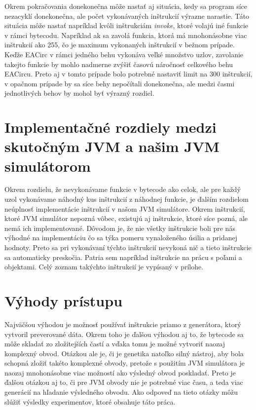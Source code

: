 Okrem pokračovania donekonečna môže nastať aj situácia, kedy sa program síce nezacyklí donekonečna, ale počet vykonávaných inštrukcií výrazne narastie. Táto situácia môže nastať napríklad kvôli inštrukciám \textit{invoke}, ktoré volajú iné funkcie v rámci bytecodu. Napríklad ak sa zavolá funkcia, ktorá má mnohonásobne viac inštrukcií ako 255, čo je maximum vykonaných inštrukcií v bežnom prípade. Keďže EACirc v rámci jedného behu vykonáva veľké množstvo uzlov, zavolanie takejto funkcie by mohlo nadmerne zvýšiť časovú náročnosť celkového behu EACircu. Preto aj v tomto prípade bolo potrebné nastaviť limit na 300 inštrukcií, v opačnom prípade by sa síce behy nepočítali donekonečna, ale medzi časmi jednotlivých behov by mohol byť výrazný rozdiel.

\section{Implementačné rozdiely medzi skutočným JVM a našim JVM simulátorom}
\label{sec:impl-diff}

Okrem rozdielu, že nevykonávame funkcie v bytecode ako celok, ale pre každý uzol vykonávame náhodný kus inštrukcií z náhodnej funkcie, je ďalším rozdielom neúplnosť implementácie inštrukcií v našom JVM simulátore. Okrem inštrukcií, ktoré JVM simulátor nepozná vôbec, existujú aj inštrukcie, ktoré síce pozná, ale nemá ich implementované. Dôvodom je, že nie všetky inštrukcie boli pre nás výhodné na implementáciu čo sa týka pomeru vynaloženého úsilia a pridanej hodnoty. Preto sa pri vykonávaní týchto inštrukcií nevykoná nič a tieto inštrukcie sa automaticky preskočia. Patria sem napríklad inštrukcie na prácu s poľami a objektami. Celý zoznam takýchto inštrukcií je vypísaný v prílohe. 

\section{Výhody prístupu}
\label{sec:advantages}

Najväčšou výhodou je možnosť používať inštrukcie priamo z generátora, ktorý vytvoril preverované dáta. Okrem toho je ďalšou výhodou aj to, že bytecode sa môže skladať zo zložitejších častí a vďaka tomu je možné vytvoriť naozaj komplexný obvod. Otázkou ale je, či je genetika natoľko silný nástroj, aby bola schopná zložiť takéto komplexné obvody, pretože s použitím JVM simulátora je naozaj mnohonásobne viac možností ako výsledný obvod poskladať. Preto je ďalšou otázkou aj to, či pre JVM obvody nie je potrebné viac času, a teda viac generácií na hľadanie výsledného obvodu. Ako odpoveď na tieto otázky môžu slúžiť výsledky experimentov, ktoré obsahuje táto práca.

